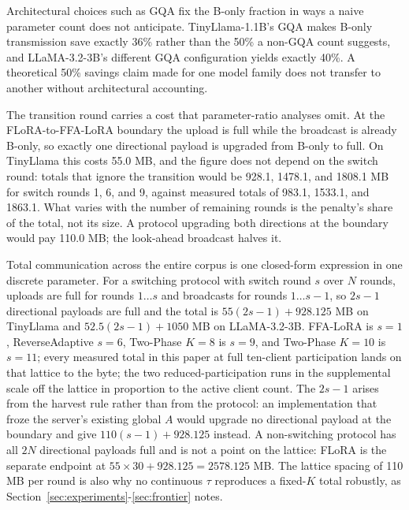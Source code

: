 Architectural choices such as GQA fix the B-only fraction in ways a naive parameter count does not anticipate. TinyLlama-1.1B's GQA makes B-only transmission save exactly 36\% rather than the 50\% a non-GQA count suggests, and LLaMA-3.2-3B's different GQA configuration yields exactly 40\%. A theoretical 50\% savings claim made for one model family does not transfer to another without architectural accounting.

The transition round carries a cost that parameter-ratio analyses omit. At the FLoRA-to-FFA-LoRA boundary the upload is full while the broadcast is already B-only, so exactly one directional payload is upgraded from B-only to full. On TinyLlama this costs 55.0 MB, and the figure does not depend on the switch round: totals that ignore the transition would be 928.1, 1478.1, and 1808.1 MB for switch rounds 1, 6, and 9, against measured totals of 983.1, 1533.1, and 1863.1. What varies with the number of remaining rounds is the penalty's share of the total, not its size. A protocol upgrading both directions at the boundary would pay 110.0 MB; the look-ahead broadcast halves it.

Total communication across the entire corpus is one closed-form expression in one discrete parameter. For a switching protocol with switch round $s$ over $N$ rounds, uploads are full for rounds $1 \ldots s$ and broadcasts for rounds $1 \ldots s{-}1$, so $2s-1$ directional payloads are full and the total is $55(2s-1) + 928.125$ MB on TinyLlama and $52.5(2s-1) + 1050$ MB on LLaMA-3.2-3B. FFA-LoRA is $s{=}1$, ReverseAdaptive $s{=}6$, Two-Phase $K{=}8$ is $s{=}9$, and Two-Phase $K{=}10$ is $s{=}11$; every measured total in this paper at full ten-client participation lands on that lattice to the byte; the two reduced-participation runs in the supplemental scale off the lattice in proportion to the active client count. The $2s-1$ arises from the harvest rule rather than from the protocol: an implementation that froze the server's existing global $A$ would upgrade no directional payload at the boundary and give $110(s-1) + 928.125$ instead. A non-switching protocol has all $2N$ directional payloads full and is not a point on the lattice: FLoRA is the separate endpoint at $55 \times 30 + 928.125 = 2578.125$ MB. The lattice spacing of 110 MB per round is also why no continuous $\tau$ reproduces a fixed-$K$ total robustly, as Section~\ref{sec:experiments}-\ref{sec:frontier} notes.

